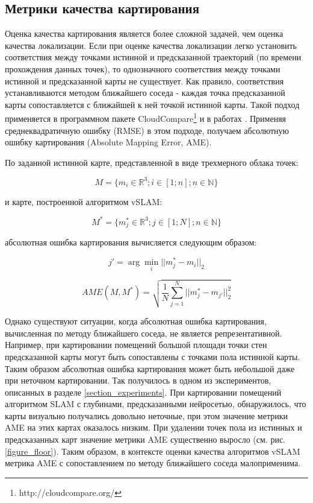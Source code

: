 \documentclass{mipt-thesis-ms}
\begin{document}
	\subsection{Метрики качества картирования}
	\label{section_our_ame}
	
	Оценка качества картирования является более сложной задачей, чем оценка качества локализации. Если при оценке качества локализации легко установить соответствия между точками истинной и предсказанной траекторий (по времени прохождения данных точек), то однозначного соответствия между точками истинной и предсказанной карты не существует. Как правило, соответствия устанавливаются методом ближайшего соседа - каждая точка предсказанной карты сопоставляется с ближайшей к ней точкой истинной карты. Такой подход применяется в программном пакете CloudCompare\footnote{http://cloudcompare.org/} и в работах \cite{handa2014benchmark}\cite{wasenmuller2016corbs}. Применяя среднеквадратичную ошибку (RMSE) в этом подходе, получаем абсолютную ошибку картирования (Absolute Mapping Error, AME).
	
	По заданной истинной карте, представленной в виде трехмерного облака точек:
	
	\begin{equation}
	M=\{m_i \in \mathbb{R}^3; i \in [1;n]; n \in \mathbb{N}\}
	\label{eq_gt_map}
	\end{equation}
	
	и карте, построенной алгоритмом vSLAM:
	
	\begin{equation}
	M^*=\{m^*_j \in \mathbb{R}^3; j \in [1;N]; n \in \mathbb{N}\}
	\label{eq_vslam_map}
	\end{equation}
	
	абсолютная ошибка картирования вычисляется следующим образом:
	
	$$j' = \arg\min\limits_{i} ||m^*_j - m_{i}||_2$$
	
	\begin{equation}
		\label{eq_ame}		
		AME(M, M^*) = \sqrt{\frac{1}{N} \sum\limits_{j=1}^N ||m^*_j  - m_{j'}||_2^2}
	\end{equation}
	
	Однако существуют ситуации, когда абсолютная ошибка картирования, вычисленная по методу ближайшего соседа, не является репрезентативной. Например, при картировании помещений большой площади точки стен предсказанной карты могут быть сопоставлены с точками пола истинной карты. Таким образом абсолютная ошибка картирования может быть небольшой даже при неточном картировании. Так получилось в одном из экспериментов, описанных в разделе \ref{section_experiments}. При картировании помещений алгоритмом SLAM с глубинами, предсказанными нейросетью, обнаружилось, что карты визуально получались довольно неточные, при этом значение метрики AME на этих картах оказалось низким. При удалении точек пола из истинных и предсказанных карт значение метрики AME существенно выросло (см. рис. \ref{figure_floor}). Таким образом, в контексте оценки качества алгоритмов vSLAM метрика AME с сопоставлением по методу ближайшего соседа малоприменима.
	
\end{document}

